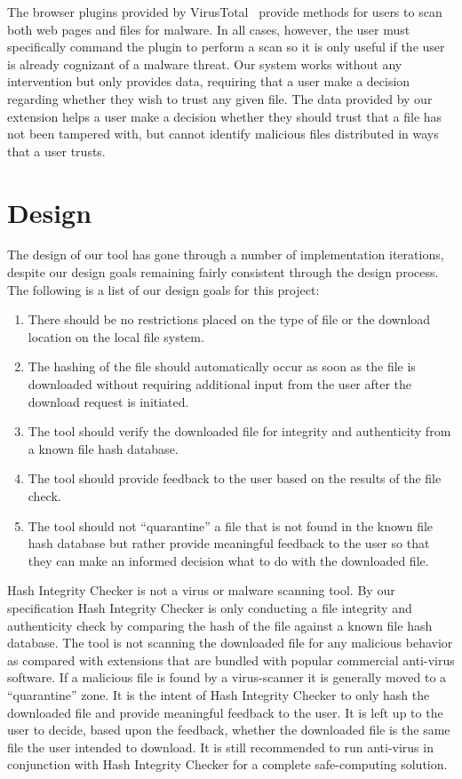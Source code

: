 \documentclass[letterpaper,twocolumn,10pt]{article}
\begin{document}
The browser plugins provided by VirusTotal~\cite{vtzilla,vtchromizer,vtexplorer} provide
methods for users to scan both web pages and files for malware. In all cases, however, the
user must specifically command the plugin to perform a scan so it is only useful if the user
is already cognizant of a malware threat. Our system works without any intervention
but only provides data, requiring that a user make a decision regarding whether they wish
to trust any given file. The data provided by our extension helps a user make a decision
whether they should trust that a file has not been tampered with, but cannot identify
malicious files distributed in ways that a user trusts.

\section{Design}

The design of our tool has gone through a number of implementation iterations, despite our design goals remaining fairly consistent through the design process. The following is a list of our design goals for this project:

\begin{enumerate}
\item There should be no restrictions placed on the type of file or the download location on the local file system.
\item The hashing of the file should automatically occur as soon as the file is downloaded without requiring additional input from the user after the download request is initiated.
\item The tool should verify the downloaded file for integrity and authenticity from a known file hash database.
\item The tool should provide feedback to the user based on the results of the file check.
\item The tool should not “quarantine” a file that is not found in the known file hash database but rather provide meaningful feedback to the user so that they can make an informed decision what to do with the downloaded file.
\end{enumerate}

Hash Integrity Checker is not a virus or malware scanning tool. By our specification Hash Integrity Checker is only conducting a file integrity and authenticity check by comparing the hash of the file against a known file hash database. The tool is not scanning the downloaded file for any malicious behavior as compared with extensions that are bundled with popular commercial anti-virus software. If a malicious file is found by a virus-scanner it is generally moved to a “quarantine” zone. It is the intent of Hash Integrity Checker to only hash the downloaded file and provide meaningful feedback to the user. It is left up to the user to decide, based upon the feedback, whether the downloaded file is the same file the user intended to download. It is still recommended to run anti-virus in conjunction with Hash Integrity Checker for a complete safe-computing solution.
\end{document}
